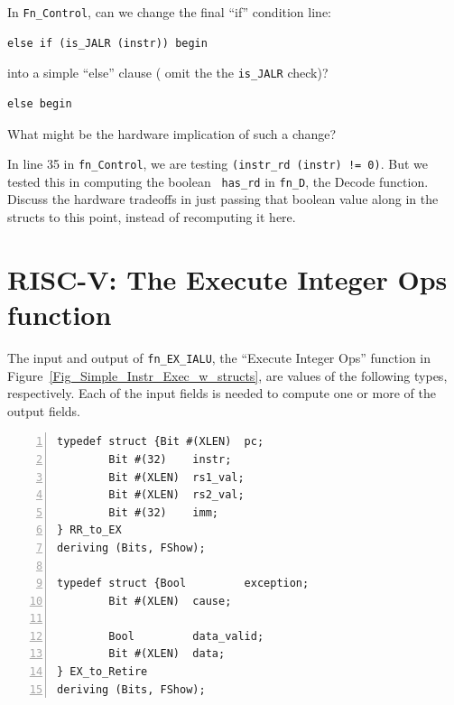 \Exercise

In \verb|Fn_Control|, can we change the final ``if'' condition line:

{\small
\begin{Verbatim}[frame=single]
   else if (is_JALR (instr)) begin
\end{Verbatim}
}

into a simple ``else'' clause ({\ie} omit the the \verb|is_JALR| check)?

{\small
\begin{Verbatim}[frame=single]
   else begin
\end{Verbatim}
}

What might be the hardware implication of such a change?

\Exercise

In line 35 in {\tt fn\_Control}, we are testing {\tt (instr\_rd
(instr) != 0)}.  But we tested this in computing the boolean {\tt
has\_rd} in {\tt fn\_D}, the Decode function.  Discuss the hardware
tradeoffs in just passing that boolean value along in the structs to
this point, instead of recomputing it here.

\Endexercise


\section{RISC-V: The Execute Integer Ops function}

\label{Sec_fn_EXI}


The input and output of \verb|fn_EX_IALU|, the ``Execute Integer Ops''
function in Figure~\ref{Fig_Simple_Instr_Exec_w_structs}, are values
of the following types, respectively.  Each of the input fields is
needed to compute one or more of the output fields.

{\small
\begin{Verbatim}[frame=single, numbers=left]
typedef struct {Bit #(XLEN)  pc;
		Bit #(32)    instr;
		Bit #(XLEN)  rs1_val;
		Bit #(XLEN)  rs2_val;
		Bit #(32)    imm;
} RR_to_EX
deriving (Bits, FShow);

typedef struct {Bool         exception;
		Bit #(XLEN)  cause;

		Bool         data_valid;
		Bit #(XLEN)  data;
} EX_to_Retire
deriving (Bits, FShow);
\end{Verbatim}
}

